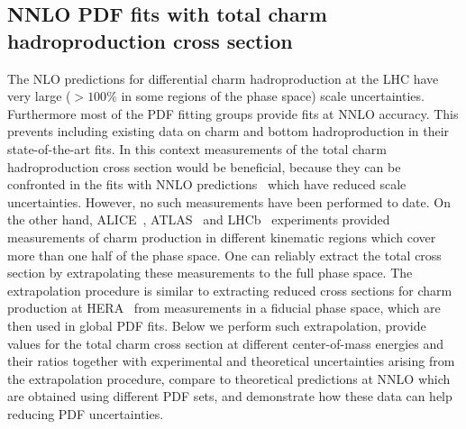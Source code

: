 \documentclass[12pt,a4paper]{article}
\begin{document}
\subsection{NNLO PDF fits with total charm hadroproduction cross section}
The NLO predictions for differential charm hadroproduction at the LHC have very large ($>100\%$ in some regions of the phase space) scale uncertainties. Furthermore most of the PDF fitting groups provide fits at NNLO accuracy. This prevents including existing data on charm and bottom hadroproduction in their state-of-the-art fits. In this context measurements of the total charm hadroproduction cross section would be beneficial, because they can be confronted in the fits with NNLO predictions~\cite{Baernreuther:2012ws,Czakon:2012zr,Czakon:2012pz,Czakon:2013goa} which have reduced scale uncertainties. However, no such measurements have been performed to date. On the other hand, ALICE~\cite{Acharya:2017jgo,Acharya:2019mgn}, ATLAS~\cite{Aad:2015zix} and LHCb~\cite{Aaij:2013mga,Aaij:2015bpa,Aaij:2016jht} experiments provided measurements of charm production in different kinematic regions which cover more than one half of the phase space. One can reliably extract the total cross section by extrapolating these measurements to the full phase space. The extrapolation procedure is similar to extracting reduced cross sections for charm production at HERA~\cite{H1:2018flt} from measurements in a fiducial phase space, which are then used in global PDF fits. Below we perform such extrapolation, provide values for the total charm cross section at different center-of-mass energies and their ratios together with experimental and theoretical uncertainties arising from the extrapolation procedure, compare to theoretical predictions at NNLO which are obtained using different PDF sets, and demonstrate how these data can help reducing PDF uncertainties.
\end{document}
